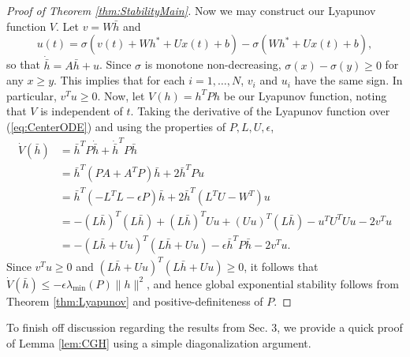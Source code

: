 \documentclass{article} \usepackage{iclr2021_conference,times}
\begin{document}
\begin{proof}[Proof of Theorem \ref{thm:StabilityMain}]
Now we may construct our Lyapunov function $V$. Let $v = W \bar{h}$ and
\[
u(t) = \sigma(v(t) + W h^\ast + U x(t) + b) - \sigma(W h^\ast + U x(t) + b),
\]
so that $\dot{\bar{h}} = A \bar{h} + u$. 
Since $\sigma$ is monotone non-decreasing, $\sigma(x) - \sigma(y) \geq 0$ for any $x \geq y$. This implies that for each $i = 1,\dots,N$, $v_i$ and $u_i$ have the same sign. In particular, $v^T u \geq 0$. Now, let $V(h) = h^T P h$ be our Lyapunov function, noting that $V$ is independent of $t$. Taking the derivative of the Lyapunov function over (\ref{eq:CenterODE}) and using the properties of $P,L,U,\epsilon$,
\begin{align*}
\dot{V}(\bar{h}) &= \bar{h}^T P \dot{\bar{h}} + \dot{\bar{h}}^T P \bar{h} \\
&= \bar{h}^T (P A + A^T P) \bar{h} + 2 \bar{h}^T P u \\
&= \bar{h}^T (-L^T L - \epsilon P) \bar{h} + 2 \bar{h}^T (L^T U - W^T) u \\
&= -(L\bar{h})^T (L\bar{h}) + (L \bar{h})^T U u + (U u)^T (L \bar{h}) - u^T U^T U u - 2 v^T u\\
&= -(L \bar{h} + U u)^T(L\bar{h} + U u) - \epsilon \bar{h}^T P \bar{h} - 2 v^T u. 
\end{align*}
Since $v^T u \geq 0$ and $(L \bar{h}+Uu)^T(L\bar{h}+Uu) \geq 0$, it follows that $\dot{V}(\bar{h}) \leq -\epsilon \lambda_{\min}(P)\|h\|^2$, and hence global exponential stability follows from Theorem \ref{thm:Lyapunov} and positive-definiteness of $P$.
\end{proof}

To finish off discussion regarding the results from Sec. 3, we provide a quick proof of Lemma \ref{lem:CGH} using a simple diagonalization argument.
\end{document}

